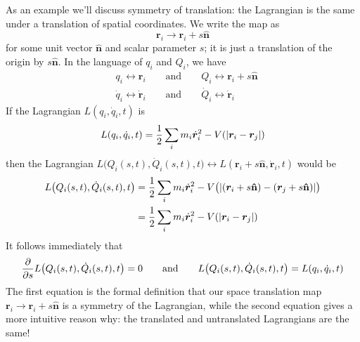 \documentclass[11pt, a4paper]{article}
\newcommand{\eqtext}[1]{\qquad \text{#1} \qquad}
\newcommand{\bdot}[1]{\dot{\bm{#1}}} %
\newcommand{\uvec}[1]{\bm{\hat{\mathbf{#1}}}} %
\begin{document}
\begin{itemize}
	As an example we'll discuss symmetry of translation: the Lagrangian is the same under a translation of spatial coordinates. We write the map as 
	\begin{equation*}
		\bm{r}_{i} \to \bm{r}_{i} + s \uvec{n}
	\end{equation*}
	for some unit vector $ \uvec{n} $ and scalar parameter $ s $; it is just a translation of the origin by $ s \uvec{n} $. In the language of $ q_{i} $ and $ Q_{i} $, we have
	\begin{align*}
		&q_{i} \leftrightarrow \bm{r}_{i} \eqtext{and} Q_{i} \leftrightarrow \bm{r}_{i} + s\uvec{n}\\
		&\dot{q}_{i} \leftrightarrow \bdot{r}_{i} \eqtext{and} \dot{Q}_{i} \leftrightarrow \bdot{r}_{i}
	\end{align*}
	If the Lagrangian $ L(q_{i}, \dot{q}_{i}, t) $ is
	\begin{equation*}
		L(q_{i}, \dot{q}_{i}, t) = \frac{1}{2}\sum_{i}m_{i} \bdot{r}_{i}^{2} - V(\abs{\bm{r}_{i} - \bm{r}_{j}})
	\end{equation*}
	then the Lagrangian $ L\big (Q_i(s, t), \dot{Q}_i(s, t), t\big ) \leftrightarrow L(\bm{r}_{i} + s\uvec{n}, \bdot{r}_{i}, t) $ would be
	\begin{align*}
	L\big (Q_i(s, t), \dot{Q}_i(s, t), t\big ) &=\frac{1}{2}\sum_{i}m_{i} \bdot{r}_{i}^{2} - V\big(\abs{(\bm{r}_{i} + s\uvec{n}) - (\bm{r}_{j} + s\uvec{n})}\big ) \\
	&=\frac{1}{2}\sum_{i}m_{i} \bdot{r}_{i}^{2} - V(\abs{\bm{r}_{i} - \bm{r}_{j}})
	\end{align*}
	It follows immediately that 
	\begin{equation*}
	\pdv{}{s}L\big (Q_i(s, t), \dot{Q}_i(s, t), t\big ) = 0 \eqtext{and}  L\big (Q_i(s, t), \dot{Q}_i(s, t), t\big ) = L(q_{i}, \dot{q}_{i}, t)
	\end{equation*}
	The first equation is the formal definition that our space translation map $ \bm{r}_{i} \to \bm{r}_{i} + s \uvec{n} $ is a symmetry of the Lagrangian, while the second equation gives a more intuitive reason why: the translated and untranslated Lagrangians are the same!
\end{itemize}
\end{document}
